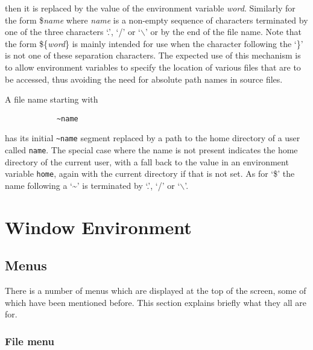 \noindent then it is replaced by the value of the environment variable 
{\em word}.
Similarly for the form \${\em name} where {\em name} is a non-empty
sequence of characters terminated by one of the three characters `.',
`/' or `$\backslash$' or by the end of the file name.  Note that the
form \$\{{\em word}\} is mainly intended for use when the character
following the `\}' is not one of these separation characters.  The
expected use of this mechanism is to allow environment variables to
specify the location of various files that are to be accessed, thus
avoiding the need for absolute path names in source
files.

A file name starting with
\begin{verbatim}
            ~name
\end{verbatim}
has its initial {\tt \~{ }name} segment replaced by a path to the home
directory of a user called {\tt name}.  The special case where the name is
not present indicates the home directory of the current user, with a
fall back to the value in an environment variable {\tt home}, again
with the current directory if that is not set.  As for `\$' the name
following a `\~{ }' is terminated by `.', `/' or `$\backslash$'.

\section{Window Environment}

\subsection{Menus}

There is a number of menus which are displayed at the top of the
screen, some of which have been mentioned before.  This section
explains briefly what they all are for.   

\subsubsection{File menu}

